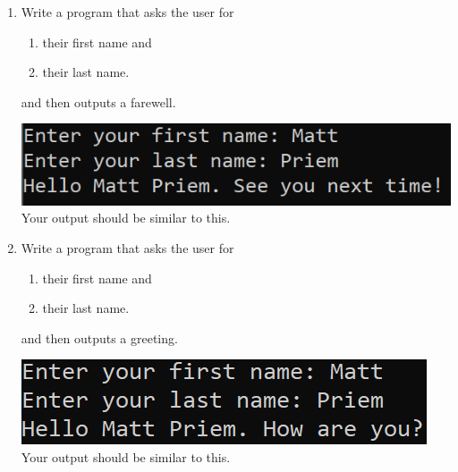\documentclass{article}
\begin{document}
\begin{enumerate}
	\item 
		Write a program that asks the user for \\
		\begin{minipage}{0.5\textwidth}
		\vspace*{-0.5em}
			\begin{enumerate}  \setlength\itemsep{-0.3em}
				\item their first name and
				\item their last name.  
			\end{enumerate} \vspace*{-1ex}
		and then outputs a farewell.
		\end{minipage}
		\begin{minipage}{0.5\textwidth}
			\centering
			\includegraphics[scale=0.9]{./imgs/outputFarewell.png}\\
			Your output should be similar to this.
		\end{minipage}



	\item 
		Write a program that asks the user for \\
		\begin{minipage}{0.5\textwidth}
		\vspace*{-0.5em}
			\begin{enumerate}  \setlength\itemsep{-0.3em}
				\item their first name and
				\item their last name.  
			\end{enumerate} \vspace*{-1ex}
		and then outputs a greeting.
		\end{minipage}
		\begin{minipage}{0.5\textwidth}
			\centering
			\includegraphics[scale=0.9]{./imgs/outputGreeting.png}\\
			Your output should be similar to this.
		\end{minipage}




\end{enumerate}
\end{document}
